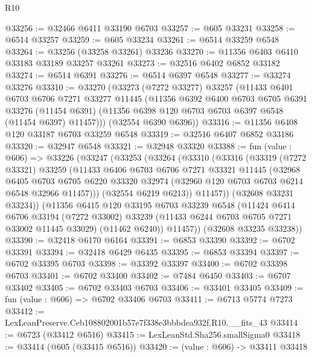 \begin{lexlean}{R10}
\begin{coremodule}
@33256 := @32466 @6411 @33190 @6703
@33257 := @605 @33231
@33258 := @6514 @33257
@33259 := @605 @33234
@33261 := @6514 @33259 @6548
@33264 := @33256 (@33258 @33261) @33236
@33270 := @11356 @6403 @6410 @33183 @33189 @33257 @33261
@33273 := @32516 @6402 @6852 @33182
@33274 := @6514 @6391
@33276 := @6514 @6397 @6548
@33277 := @33274 @33276
@33310 := @33270
    (@33273
      (@7272 @33277)
      @33257
      (@11433
        @6401
        @6703
        @6706
        @7271
        @33277
        @11445
        (@11356
          @6392
          @6400
          @6703
          @6705
          @6391
          @33276
          (@11454 @6391)
          (@11356 @6398 @120 @6703 @6703 @6397 @6548 (@11454 @6397) @11457)))
      (@32554 @6390 @6396))
@33316 := @11356 @6408 @120 @33187 @6703 @33259 @6548
@33319 := @32516 @6407 @6852 @33186
@33320 := @32947 @6548
@33321 := @32948 @33320
@33388 := fun (value : @606) =>
  @33226
    (@33247
      (@33253
        (@33264
          (@33310
            (@33316
              (@33319
                (@7272 @33321)
                @33259
                (@11433
                  @6406
                  @6703
                  @6706
                  @7271
                  @33321
                  @11445
                  (@32968
                    @6405
                    @6703
                    @6705
                    @6220
                    @33320
                    @32974
                    (@32960 @120 @6703 @6703 @6214 @6548 @32966 @11457)))
                (@32554 @6219 @6213))
              @11457))
          (@32608 @33231 @33234))
        (@11356
          @6415
          @120
          @33195
          @6703
          @33239
          @6548
          (@11424
            @6414
            @6706
            @33194
            (@7272 @33002)
            @33239
            (@11433 @6244 @6703 @6705 @7271 @33002 @11445 @33029)
            (@11462 @6240))
          @11457))
      (@32608 @33235 @33238))
@33390 := @32418 @6170 @6164
@33391 := @6853 @33390
@33392 := @6702 @33391
@33394 := @32418 @6429 @6435
@33395 := @6853 @33394
@33397 := @6702 @33395 @6703
@33398 := @33392 @33397
@33400 := @6702 @33398 @6703
@33401 := @6702 @33400
@33402 := @7484 @6450
@33403 := @6707 @33402
@33405 := @6702 @33403 @6703
@33406 := @33401 @33405
@33409 := fun (value : @606) => @6702 @33406 @6703
@33411 := @6713 @5774 @7273
@33412 := LexLeanPreserve.Ceb108802001b57e7f338e3bbbdea932f.R10.__fits_43
@33414 := @6723 (@33412 @6516)
@33415 := LexLeanStd.Sha256.smallSigma0
@33418 := @33414 (@605 (@33415 @6516))
@33420 := (value : @606) -> @33411 @33418

\end{coremodule}
\end{lexlean}
